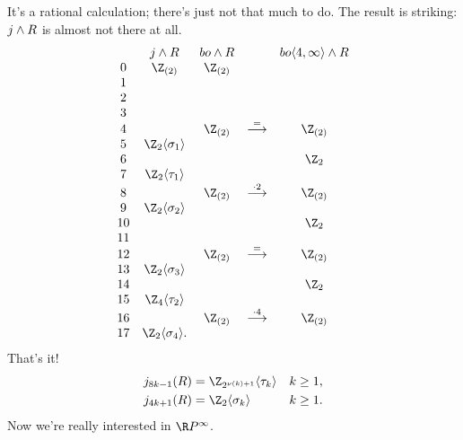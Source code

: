 It's a rational calculation; there's just not that much to do.  The result is striking: $j \wedge R$ is almost not there at all.
\[
\begin{array}{ccccc}
& j \sprod R & bo \sprod R & & bo \langle 4, \infty \rangle \sprod R \\
0 & \Z_{(2)} & \Z_{(2)} \\
1 \\
2 \\
3 \\
4 & & \Z_{(2)} & \stackrel{=}{\to} & \Z_{(2)} \\
5 & \Z_2 \langle \sigma_1 \rangle \\
6 & & & & \Z_2 \\
7 & \Z_2 \langle \tau_1 \rangle \\
8 & & \Z_{(2)} & \stackrel{\cdot 2}{\to} & \Z_{(2)} \\
9 & \Z_2 \langle \sigma_2 \rangle \\
10 & & & & \Z_2 \\
11 \\
12 & & \Z_{(2)} & \stackrel{=}{\to} & \Z_{(2)} \\
13 & \Z_2 \langle \sigma_3 \rangle \\
14 & & & & \Z_2 \\
15 & \Z_4 \langle \tau_2 \rangle \\
16 & & \Z_{(2)} & \stackrel{\cdot 4}{\to} & \Z_{(2)} \\
17 & \Z_2 \langle \sigma_4 \rangle.
\end{array}
\]
That's it!
\begin{align*}
j_{8k-1}(R) & = \Z_{2^{\nu(k)+1}} \langle \tau_k \rangle & k \ge 1, \\
j_{4k+1}(R) & = \Z_2 \langle \sigma_k \rangle & k \ge 1.
\end{align*}
Now we're really interested in $\RP^\infty$.
